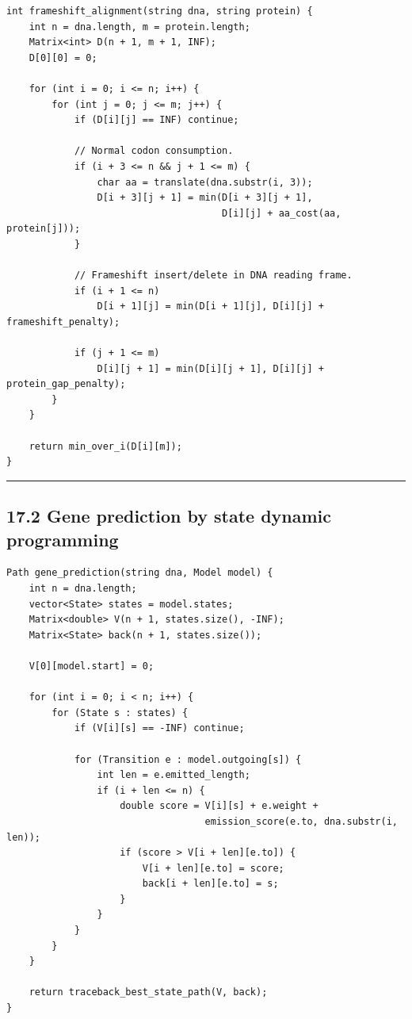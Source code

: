 \documentclass[11pt]{article}
\begin{document}
\begin{verbatim}
int frameshift_alignment(string dna, string protein) {
    int n = dna.length, m = protein.length;
    Matrix<int> D(n + 1, m + 1, INF);
    D[0][0] = 0;

    for (int i = 0; i <= n; i++) {
        for (int j = 0; j <= m; j++) {
            if (D[i][j] == INF) continue;

            // Normal codon consumption.
            if (i + 3 <= n && j + 1 <= m) {
                char aa = translate(dna.substr(i, 3));
                D[i + 3][j + 1] = min(D[i + 3][j + 1],
                                      D[i][j] + aa_cost(aa, protein[j]));
            }

            // Frameshift insert/delete in DNA reading frame.
            if (i + 1 <= n)
                D[i + 1][j] = min(D[i + 1][j], D[i][j] + frameshift_penalty);

            if (j + 1 <= m)
                D[i][j + 1] = min(D[i][j + 1], D[i][j] + protein_gap_penalty);
        }
    }

    return min_over_i(D[i][m]);
}
\end{verbatim}

\begin{center}\rule{0.5\linewidth}{0.5pt}\end{center}

\subsection{17.2 Gene prediction by state dynamic programming}\label{gene-prediction-by-state-dynamic-programming}

\begin{verbatim}
Path gene_prediction(string dna, Model model) {
    int n = dna.length;
    vector<State> states = model.states;
    Matrix<double> V(n + 1, states.size(), -INF);
    Matrix<State> back(n + 1, states.size());

    V[0][model.start] = 0;

    for (int i = 0; i < n; i++) {
        for (State s : states) {
            if (V[i][s] == -INF) continue;

            for (Transition e : model.outgoing[s]) {
                int len = e.emitted_length;
                if (i + len <= n) {
                    double score = V[i][s] + e.weight +
                                   emission_score(e.to, dna.substr(i, len));
                    if (score > V[i + len][e.to]) {
                        V[i + len][e.to] = score;
                        back[i + len][e.to] = s;
                    }
                }
            }
        }
    }

    return traceback_best_state_path(V, back);
}
\end{verbatim}
\end{document}
